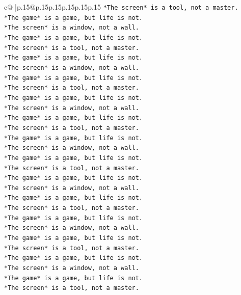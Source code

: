 \documentclass{article}
\begin{document}
{\begin{supertabular}{c@{$\;$}|p{.15\linewidth}@{}p{.15\linewidth}p{.15\linewidth}p{.15\linewidth}p{.15\linewidth}p{.15\linewidth}}
{{{\texttt{*The screen* is a tool, not a master.} \\
\texttt{*The game* is a game, but life is not.} \\
\texttt{*The screen* is a window, not a wall.} \\
\texttt{*The game* is a game, but life is not.} \\
\texttt{*The screen* is a tool, not a master.} \\
\texttt{*The game* is a game, but life is not.} \\
\texttt{*The screen* is a window, not a wall.} \\
\texttt{*The game* is a game, but life is not.} \\
\texttt{*The screen* is a tool, not a master.} \\
\texttt{*The game* is a game, but life is not.} \\
\texttt{*The screen* is a window, not a wall.} \\
\texttt{*The game* is a game, but life is not.} \\
\texttt{*The screen* is a tool, not a master.} \\
\texttt{*The game* is a game, but life is not.} \\
\texttt{*The screen* is a window, not a wall.} \\
\texttt{*The game* is a game, but life is not.} \\
\texttt{*The screen* is a tool, not a master.} \\
\texttt{*The game* is a game, but life is not.} \\
\texttt{*The screen* is a window, not a wall.} \\
\texttt{*The game* is a game, but life is not.} \\
\texttt{*The screen* is a tool, not a master.} \\
\texttt{*The game* is a game, but life is not.} \\
\texttt{*The screen* is a window, not a wall.} \\
\texttt{*The game* is a game, but life is not.} \\
\texttt{*The screen* is a tool, not a master.} \\
\texttt{*The game* is a game, but life is not.} \\
\texttt{*The screen* is a window, not a wall.} \\
\texttt{*The game* is a game, but life is not.} \\
\texttt{*The screen* is a tool, not a master.} \\
}}}
\end{supertabular}}
\end{document}
